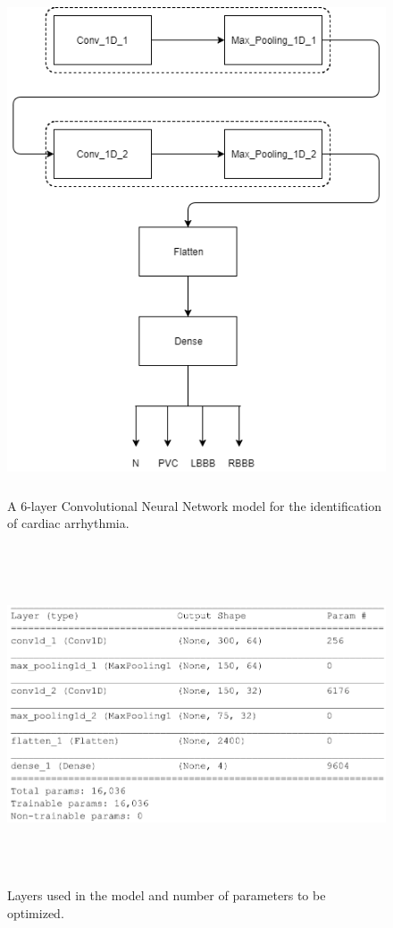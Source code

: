 \begin{figure}[htpb]
	\centering
	\includegraphics[width=20cm,height=15cm,keepaspectratio=true]{images/cnn_model}
	\caption{
		A 6-layer Convolutional Neural Network model for the identification of cardiac arrhythmia.
	}
	\label{fig:cnn_model}
\end{figure}


\begin{figure}[htpb]
	\centering
	\includegraphics[width=12cm,height=10cm,keepaspectratio=true]{images/model_def_var}
	\caption{
		Layers used in the model and number of parameters to be optimized.
	}
	\label{fig:model_def_var}
\end{figure}


